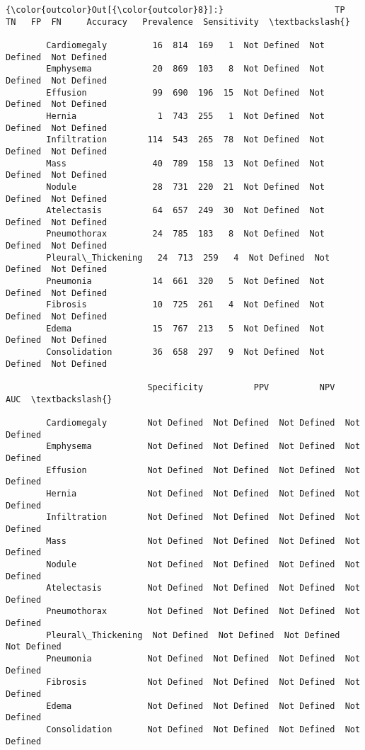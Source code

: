 \documentclass[11pt]{article}
\begin{document}
\begin{Verbatim}[commandchars=\\\{\}]
{\color{outcolor}Out[{\color{outcolor}8}]:}                      TP   TN   FP  FN     Accuracy   Prevalence  Sensitivity  \textbackslash{}
                                                                                       
        Cardiomegaly         16  814  169   1  Not Defined  Not Defined  Not Defined   
        Emphysema            20  869  103   8  Not Defined  Not Defined  Not Defined   
        Effusion             99  690  196  15  Not Defined  Not Defined  Not Defined   
        Hernia                1  743  255   1  Not Defined  Not Defined  Not Defined   
        Infiltration        114  543  265  78  Not Defined  Not Defined  Not Defined   
        Mass                 40  789  158  13  Not Defined  Not Defined  Not Defined   
        Nodule               28  731  220  21  Not Defined  Not Defined  Not Defined   
        Atelectasis          64  657  249  30  Not Defined  Not Defined  Not Defined   
        Pneumothorax         24  785  183   8  Not Defined  Not Defined  Not Defined   
        Pleural\_Thickening   24  713  259   4  Not Defined  Not Defined  Not Defined   
        Pneumonia            14  661  320   5  Not Defined  Not Defined  Not Defined   
        Fibrosis             10  725  261   4  Not Defined  Not Defined  Not Defined   
        Edema                15  767  213   5  Not Defined  Not Defined  Not Defined   
        Consolidation        36  658  297   9  Not Defined  Not Defined  Not Defined   
        
                            Specificity          PPV          NPV          AUC  \textbackslash{}
                                                                                 
        Cardiomegaly        Not Defined  Not Defined  Not Defined  Not Defined   
        Emphysema           Not Defined  Not Defined  Not Defined  Not Defined   
        Effusion            Not Defined  Not Defined  Not Defined  Not Defined   
        Hernia              Not Defined  Not Defined  Not Defined  Not Defined   
        Infiltration        Not Defined  Not Defined  Not Defined  Not Defined   
        Mass                Not Defined  Not Defined  Not Defined  Not Defined   
        Nodule              Not Defined  Not Defined  Not Defined  Not Defined   
        Atelectasis         Not Defined  Not Defined  Not Defined  Not Defined   
        Pneumothorax        Not Defined  Not Defined  Not Defined  Not Defined   
        Pleural\_Thickening  Not Defined  Not Defined  Not Defined  Not Defined   
        Pneumonia           Not Defined  Not Defined  Not Defined  Not Defined   
        Fibrosis            Not Defined  Not Defined  Not Defined  Not Defined   
        Edema               Not Defined  Not Defined  Not Defined  Not Defined   
        Consolidation       Not Defined  Not Defined  Not Defined  Not Defined   
        

\end{Verbatim}
\end{document}
